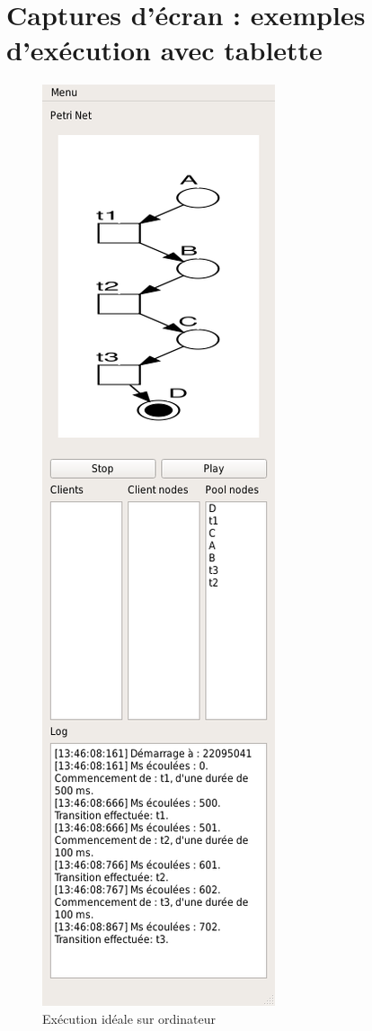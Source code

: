 	\chapter{Captures d'écran : exemples d'exécution avec tablette}
	\begin{figure}
		\centering
		\includegraphics[scale=0.45]{images/resultats/server_simple_correct.png}
		
		\caption{Exécution idéale sur ordinateur}
		\label{fig.executionTheorique}
	\end{figure}
	
